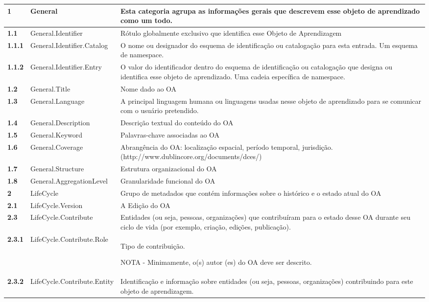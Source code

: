 \begin{xltabular}{\textwidth}{|l|l|X|}
	\endlastfoot	
\textbf{1} & General & Esta categoria agrupa as informações gerais que   descrevem esse objeto de aprendizado como um todo. \\ \hline
\textbf{1.1} & General.Identifier & Rótulo globalmente exclusivo que identifica esse Objeto de Aprendizagem \\ \hline
\textbf{1.1.1} & General.Identifier.Catalog & O nome ou designador do esquema de identificação ou catalogação para esta entrada. Um esquema de namespace. \\ \hline
\textbf{1.1.2} & General.Identifier.Entry & O valor do identificador dentro do esquema de identificação ou catalogação que designa ou identifica esse objeto de aprendizado. Uma cadeia específica de namespace. \\ \hline
\textbf{1.2} & General.Title & Nome dado ao OA \\ \hline
\textbf{1.3} & General.Language & A principal linguagem humana ou linguagens usadas nesse objeto de aprendizado para se comunicar com o usuário pretendido. \\ \hline
\textbf{1.4} & General.Description & Descrição textual do conteúdo do OA \\ \hline
\textbf{1.5} & General.Keyword & Palavras-chave associadas ao OA \\ \hline
\textbf{1.6} & General.Coverage & Abrangência do OA: localização espacial, período temporal, jurisdição. (http://www.dublincore.org/documents/dces/) \\ \hline
\textbf{1.7} & General.Structure & Estrutura organizacional do OA \\ \hline
\textbf{1.8} & General.AggregationLevel & Granularidade funcional do OA \\ \hline
\textbf{2} & LifeCycle & Grupo de metadados que contém informações sobre o histórico e o estado atual do OA \\ \hline
\textbf{2.1} & LifeCycle.Version & A Edição do OA \\ \hline
\textbf{2.3} & LifeCycle.Contribute & Entidades (ou seja, pessoas, organizações) que contribuíram para o estado desse OA durante seu ciclo de vida (por exemplo, criação, edições, publicação). \\ \hline
\textbf{2.3.1} & LifeCycle.Contribute.Role & Tipo de contribuição. 

NOTA - Minimamente, o(s) autor (es) do OA deve ser descrito.\\ \hline
\textbf{2.3.2} & LifeCycle.Contribute.Entity & Identificação e informação sobre entidades (ou seja, pessoas, organizações) contribuindo para este objeto de aprendizagem. 


\end{xltabular}
